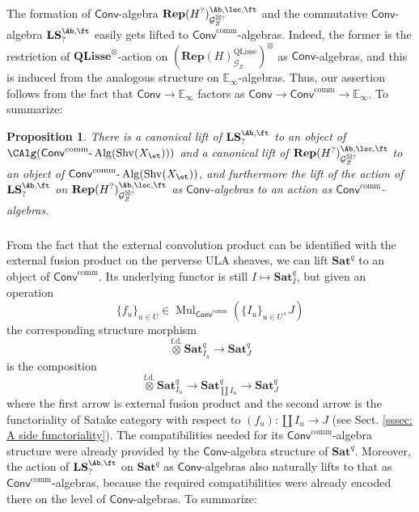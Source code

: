 \documentclass[10pt]{amsart}
\newcommand{\sssec}{\subsubsection}
\newtheorem{prop}[subsubsection]{Proposition}
\theoremstyle{remark}
\newcommand{\E}{\mathbb{E}}
\newcommand{\on}{\operatorname}
\newcommand{\cG}{\mathcal{G}}
\newcommand{\lAlg}{\text{-}\on{Alg}}
\newcommand{\Shv}{\on{Shv}}
\newcommand{\QLisse}{\on{QLisse}}
\newcommand{\Mul}{\on{Mul}}
\newcommand{\Conv}{\mathsf{Conv}}
\newcommand{\Convcomm}{\mathsf{Conv}^{\on{comm}}}
\newcommand{\Ectens}{\stackrel{\on{f.d.}}{\otimes}}
\begin{document}
    The formation of $\Conv$-algebra $\mathbf{Rep}(H^?)^{\Ab,\loc,\ft}_{\cG^{\boxtimes ?}_Z}$ and the commutative $\Conv$-algebra $\mathbf{LS}^{\Ab,\ft}_{?}$ easily gets lifted to $\Convcomm$-algebras. Indeed, the former is the restriction of $\mathbf{QLisse}^{\otimes}$-action on $\left(\mathbf{Rep}(H)^{\QLisse}_{\cG_Z}\right)^{\otimes}$ as $\Conv$-algebras, and this is induced from the analogous structure on $\E_{\infty}$-algebras. Thus, our assertion follows from the fact that $\Conv\rightarrow \E_{\infty}$ factors as $\Conv\rightarrow\Convcomm\rightarrow \E_{\infty}$.
    To summarize:

    \begin{prop}
        There is a canonical lift of $\mathbf{LS}^{\Ab,\ft}_{?}$ to an object of $\CAlg(\Convcomm\lAlg(\Shv(X_{\et})))$ and a canonical lift of $\mathbf{Rep}(H^?)^{\Ab,\loc,\ft}_{\cG^{\boxtimes ?}_Z}$ to an object of $\Convcomm\lAlg(\Shv(X_{\et}))$, and furthermore the lift of the action of $\mathbf{LS}^{\Ab,\ft}_{?}$ on $\mathbf{Rep}(H^?)^{\Ab,\loc,\ft}_{\cG^{\boxtimes ?}_Z}$ as $\Conv$-algebras to an action as $\Convcomm$-algebras.
    \end{prop}


    \sssec{} 
    From the fact that the external convolution product can be identified with the external fusion product on the perverse ULA sheaves, we can lift $\textbf{Sat}^q$ to an object of $\Convcomm$. Its underlying functor is still $I\mapsto \mathbf{Sat}^q_{I}$, but given an operation
    \[\{f_u\}_{u\in U}\in\Mul_{\Convcomm}(\{I_u\}_{u\in U}, J)\]
    the corresponding structure morphism
    \begin{equation}\label{eq: Convcomm operation for Sat}
        \Ectens\mathbf{Sat}^q_{I_u}\rightarrow \mathbf{Sat}^q_{J}
    \end{equation}
    is the composition
    \[\Ectens\mathbf{Sat}^q_{I_u}\rightarrow \mathbf{Sat}^q_{\coprod I_u}\rightarrow  \mathbf{Sat}^q_{J}\]
    where the first arrow is external fusion product and the second arrow is the functoriality of Satake category with respect to $(f_u): \coprod I_u\rightarrow J$ (see Sect. \ref{sssec: A side functoriality}). The compatibilities needed for its $\Convcomm$-algebra structure were already provided by the $\Conv$-algebra structure of $\mathbf{Sat}^q$. Moreover, the action of $\mathbf{LS}^{\Ab,\ft}_?$ on $\mathbf{Sat}^q$ as $\Conv$-algebras also naturally lifts to that as $\Convcomm$-algebras, because the required compatibilities were already encoded there on the level of $\Conv$-algebras. To summarize:
\end{document}
